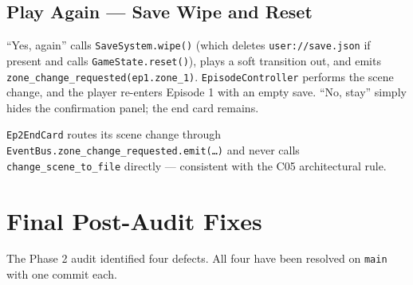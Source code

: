 \documentclass[12pt, a4paper]{article}
\begin{document}
\subsection{Play Again --- Save Wipe and Reset}

``Yes, again'' calls \texttt{SaveSystem.wipe()} (which deletes
\texttt{user://save.json} if present and calls \texttt{GameState.reset()}),
plays a soft transition out, and emits
\texttt{zone\_change\_requested(ep1.zone\_1)}. \texttt{EpisodeController}
performs the scene change, and the player re-enters Episode 1 with an empty
save. ``No, stay'' simply hides the confirmation panel; the end card remains.

\texttt{Ep2EndCard} routes its scene change through
\texttt{EventBus.zone\_change\_requested.emit(\dots)} and never calls
\texttt{change\_scene\_to\_file} directly --- consistent with the C05
architectural rule.

\section{Final Post-Audit Fixes}

The Phase 2 audit identified four defects. All four have been resolved on
\texttt{main} with one commit each.
\end{document}
